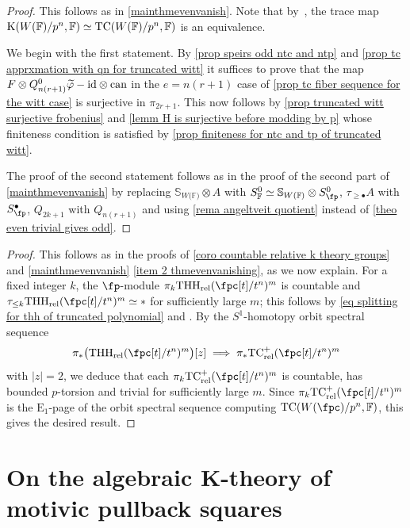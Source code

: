 \documentclass[english,10pt]{amsart}
\newcommand{\sphwf}{\mathbb{S}_{W(\mathbb{F)}}}
\newcommand{\rel}{\textup{rel}}
\newcommand{\field}{\mathbb{F}}
\theoremstyle{definition}
\numberwithin{equation}{section}
\DeclareMathOperator{\tc}{\ensuremath{\textup{TC}}}
\newcommand{\rtc}{\mathrm{TC}_{\rel}}
\newcommand{\rthh}{\mathrm{THH}_{\rel}}
\newcommand{\wtw}{\tau_{\geq \bullet}}
\newcommand{\pis}{\pi_*}
\begin{document}
\mainthmcardinalitywitt*
\begin{proof}
This follows as in \autoref{mainthmevenvanish}. Note that by~\cite[Theorem~7.2.2.1]{DGM13}, the trace map $\mathrm{K}(W(\field)/p^n,\field) \simeq \tc(W(\field)/p^n,\field)$ is an equivalence.

We  begin with the first statement. 
By \autoref{prop speirs odd ntc and ntp} and \autoref{prop tc apprxmation with qn for truncated witt} it suffices to prove that the map $F \otimes Q_{n(r+1)}^0 \widetilde{\varphi} - \textup{id} \otimes \textup{can}$ in the $e = n(r+1)$ case of \autoref{prop tc fiber sequence for the witt case} is surjective in $\pi_{2r+1}$. This now follows by \autoref{prop truncated witt surjective frobenius} and \autoref{lemm H  is surjective before modding by p} whose finiteness condition is satisfied by \autoref{prop finiteness for ntc and tp of truncated witt}.

The proof of the second statement follows as in the proof of the second part of \autoref{mainthmevenvanish} by replacing $\sphwf \otimes A$ with $S_{\field}^0 \simeq \sphwf \otimes S_{\fp}^{0}$, $\wtw A$ with $S_{\fp}^\bullet$, $Q_{2k+1}$ with $Q_{n(r+1)}$ and using \autoref{rema angeltveit quotient} instead of \autoref{theo even trivial gives odd}.
\end{proof}

\maincorcardinalitywitt*

\begin{proof}
This follows as in the proofs of \autoref{coro countable relative k theory groups} and \autoref{mainthmevenvanish} \eqref{item 2 thmevenvanishing}, as we now explain. For a fixed integer $k$, the $\fp$-module $\pi_{k} \rthh(\fpc[t]/t^n)^m$ is countable and $\tau_{\leq k}\rthh(\fpc[t]/t^n)^m \simeq *$ for sufficiently large $m$; this follows by \eqref{eq splitting for thh of truncated polynomial} and \cite[Proposition 3]{speirs2020truncatedpolynomial}. By the  $S^1$-homotopy orbit spectral sequence 
\[\pis \big(\rthh(\fpc[t]/t^n)^m\big)[z] \implies \pis \rtc^+(\fpc[t]/t^n)^m\]
with $\lvert z\rvert = 2$, we deduce that each 
$\pi_k \rtc^+(\fpc[t]/t^n)^m$ is countable, has bounded $p$-torsion and trivial for sufficiently large $m$. Since  $\pi_k \rtc^+(\fpc[t]/t^n)^m$ is the $\mathrm{E}_1$-page of the orbit spectral sequence computing $\tc(W(\fpc)/p^n,\field)$, this gives the desired result. 
\end{proof}




\section{On the algebraic K-theory of motivic pullback squares}\label{sec applications to discrete rings}
\end{document}
